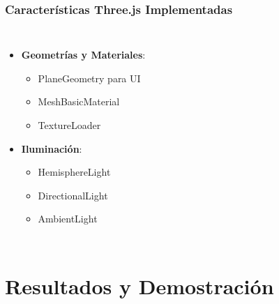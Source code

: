 \documentclass{beamer}
\begin{document}
\begin{frame}
\frametitle{Características Three.js Implementadas}
\begin{columns}
\begin{itemize}
    \item<1-> \textbf{Geometrías y Materiales}:
    \begin{itemize}
        \item<2-> PlaneGeometry para UI
        \item<3-> MeshBasicMaterial
        \item<4-> TextureLoader
    \end{itemize}
    \item<5-> \textbf{Iluminación}:
    \begin{itemize}
        \item<6-> HemisphereLight
        \item<7-> DirectionalLight
        \item<8-> AmbientLight
    \end{itemize}
\end{itemize}

\end{columns}
\end{frame}

\section{Resultados y Demostración}
\end{document}
